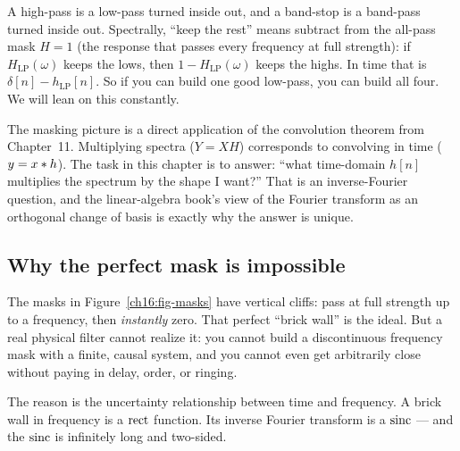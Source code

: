 \begin{intuitionbox}
A high-pass is a low-pass turned inside out, and a band-stop is a band-pass turned
inside out. Spectrally, ``keep the rest'' means subtract from the all-pass mask
$H=1$ (the response that passes every frequency at full strength): if $H_{\text{LP}}(\omega)$ keeps the lows, then $1 - H_{\text{LP}}(\omega)$
keeps the highs. In time that is $\delta[n] - h_{\text{LP}}[n]$. So if you can
build one good low-pass, you can build all four. We will lean on this constantly.
\end{intuitionbox}

\begin{connectionbox}
The masking picture is a direct application of the convolution theorem from
Chapter~11. Multiplying spectra ($Y = XH$) corresponds to convolving in time
($y = x \ast h$). The task in this chapter is to answer: ``what time-domain $h[n]$
multiplies the spectrum by the shape I want?'' That is an inverse-Fourier
question, and the linear-algebra book's view of the Fourier transform as an
orthogonal change of basis is exactly why the answer is unique.
\end{connectionbox}

\subsection{Why the perfect mask is impossible}
\label{ch16:why-impossible}

The masks in Figure~\ref{ch16:fig-masks} have vertical cliffs: pass at full
strength up to a frequency, then \emph{instantly} zero. That perfect ``brick
wall'' is the ideal. But a real physical filter cannot realize it: you
cannot build a discontinuous frequency mask with a finite, causal system, and you
cannot even get arbitrarily close without paying in delay, order, or ringing.

The reason is the uncertainty relationship between time and frequency. A brick
wall in frequency is a $\operatorname{rect}$ function. Its inverse Fourier transform is a
$\operatorname{sinc}$ --- and the $\operatorname{sinc}$ is infinitely long and two-sided.

